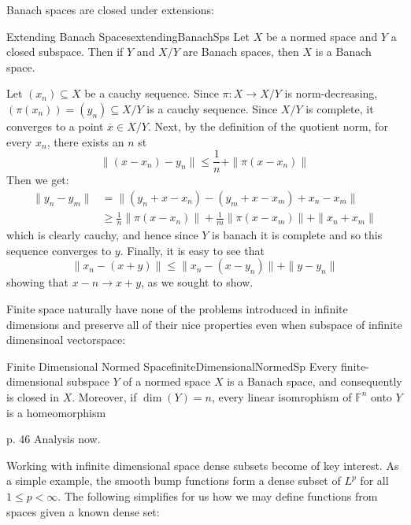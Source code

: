 \documentclass[oneside]{book}
\newcommand{\F}{\mathbb{F}}
\newcommand{\sse}{\subseteq}
\newcommand{\oln}{\overline}
\newcommand{\rw}{\rightarrow}
\begin{document}
Banach spaces are closed under extensions:

\begin{prop}{Extending Banach Spaces}{extendingBanachSps}
	Let $X$ be a normed space and $Y$ a closed subspace. Then if $Y$ and $X/Y$ are Banach spaces, then $X$ is
	a Banach space.
\end{prop}

\begin{Proof}
	Let $(x_n) \sse X$ be a cauchy sequence. Since $\pi: X \rw X/Y$ is norm-decreasing, $(\pi(x_n)) = (y_n) \sse
	X/Y$ is a cauchy sequence. Since $X/Y$ is complete, it converges to a point $\oln{x} \in X/Y$. Next, by
	the definition of the quotient norm, for every $x_n$, there exists an $n$ st
	\[
		\|(x - x_n) - y_n\| \le \frac{1}{n} + \|\pi(x - x_n)\|
	\]
	Then we get:
	\begin{align*}
		\|y_n - y_m\| &= \| (y_n  + x - x_n) -(y_m +x - x_m) + x_n - x_m\|\\
					  &\ge \frac{1}{n} \|\pi(x - x_n)\| + \frac{1}{m} \|\pi(x - x_m)\|
					  + \|x_n + x_m\|
	\end{align*}
	which is clearly cauchy, and hence since $Y$ is banach it is complete and so this sequence converges to $y$.
	Finally, it is easy to see that
	\[
		\|x_n - (x+y)\| \le \|x_n - (x - y_n)\| + \|y - y_n\|
	\]
	showing that $x-n \rw x + y$, as we sought to show.
\end{Proof}

Finite space naturally have none of the problems introduced in infinite dimensions and preserve all of their nice
properties even when subspace of infinite dimensinoal vectorspace:

\begin{prop}{Finite Dimensional Normed Space}{finiteDimensionalNormedSp}
	Every finite-dimensional subspace $Y$ of a normed space $X$ is a Banach space, and consequently is closed in
	$X$. Moreover, if $\dim(Y) = n$, every linear isomrophism of $\F^n$ onto $Y$ is a homeomorphism
\end{prop}

\begin{Proof}
	p. 46 Analysis now.
\end{Proof}


Working with infinite dimensional space dense subsets become of key interest. As a simple example, the smooth bump
functions form a dense subset of $L^p$ for all $1 \le p < \infty$. The following simplifies for us how we may define
functions from spaces given a known dense set:
\end{document}
